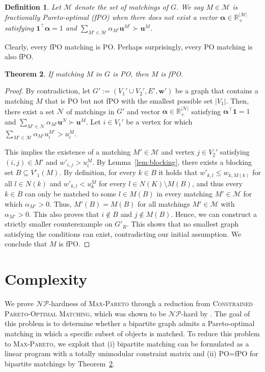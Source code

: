 \documentclass[a4paper, 11pt]{article}
\newtheorem{thm}{Theorem}
\newtheorem{defin}[thm]{Definition}
\newcommand{\mc}{\mathcal}
\begin{document}
\begin{defin}
\label{def:fpo_matching}
Let $\mc{M}$ denote the set of matchings of $G$. We say $M \in \mc{M}$ is fractionally Pareto-optimal (fPO) when there does not exist a vector $\bm{\alpha} \in \mathbb{R}^{|\mc{M}|}_{+}$ satisfying $\bm{1}^\top \bm{\alpha} = 1$ and $\sum\limits_{M' \in \mc{M}} \alpha_{M'} \bm{u}^{M'} \succ \bm{u}^{M}$.
\end{defin}
Clearly, every fPO matching is PO. Perhaps surprisingly, every PO matching is also fPO.
\begin{thm}
If matching $M$ in $G$ is PO, then $M$ is fPO. 
\label{thm:fpo_matching}
\end{thm}

\begin{proof}
By contradiction, let $G' := (V_1' \cup V_2', E', \bm{w}')$ be a graph that contains a matching $M$ that is PO but not fPO with the smallest possible set $|V_1|$. Then, there exist a set $\mc{N}$ of matchings in $G'$ and vector $\bm{\alpha} \in \mathbb{R}^{|\mc{N}|}_{+}$ satisfying $\bm{\alpha}^\top \bm{1} = 1$ and $\sum\limits_{M' \in \mc{N}} \alpha_{M'} \bm{u}^{N} \succ \bm{u}^{M}$. Let $i \in V_1'$ be a vertex for which $\sum\limits_{M' \in \mc{M}} \alpha_{M'} u_{i}^{M'} > u_{i}^{M}$.

This implies the existence of a matching $M' \in \mc{M}$ and vertex $j \in V_2'$ satisfying $(i, j) \in M'$ and $w'_{i,j} > u_i^M$. By Lemma~\ref{lem:blocking}, there exists a blocking set $B \subseteq V'_1(M)$. By definition, for every $k \in B$ it holds that $w'_{k,l} \leq w_{k,M(k)}$ for all $l\in N(k)$ and $w'_{k,l} < u_k^M$ for every $l \in N(K)\setminus M(B)$, and thus every $k \in B$ can only be matched to some $l \in M(B)$ in every matching $M' \in \mc{M}$ for which $\alpha_{M'} > 0$.
Thus, $M'(B) = M(B)$ for all matchings $M'\in \mc{M}$ with $\alpha_{M'} > 0$. This also proves that $i\notin B$ and $j \notin M(B)$. Hence, we can construct a strictly smaller counterexample on $G'_{R}$. This shows that no smallest graph satisfying the conditions can exist, contradicting our initial assumption. We conclude that $M$ is fPO.
\end{proof}

\section{Complexity}
\label{sec:complexity}

We prove $\mathcal{NP}$-hardness of \textsc{Max-Pareto} through a reduction from \textsc{Constrained Pareto-Optimal Matching}, which was shown to be $\mathcal{NP}$-hard by \citet{saban2015complexity}. The goal of this problem is to determine whether a bipartite graph admits a Pareto-optimal matching in which a specific subset of objects is matched. To reduce this problem to \textsc{Max-Pareto}, we exploit that (i) bipartite matching can be formulated as a linear program with a totally unimodular constraint matrix and (ii) PO=fPO for bipartite matchings by Theorem~\ref{thm:fpo_matching}. 
\end{document}
